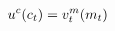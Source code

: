   \begin{equation}\begin{gathered}\begin{aligned}
        u^{c}(c_{t})  & = {v}^{m}_{t}(m_{t})\label{eq:upcteqvtp}
      \end{aligned}\end{gathered}\end{equation}
